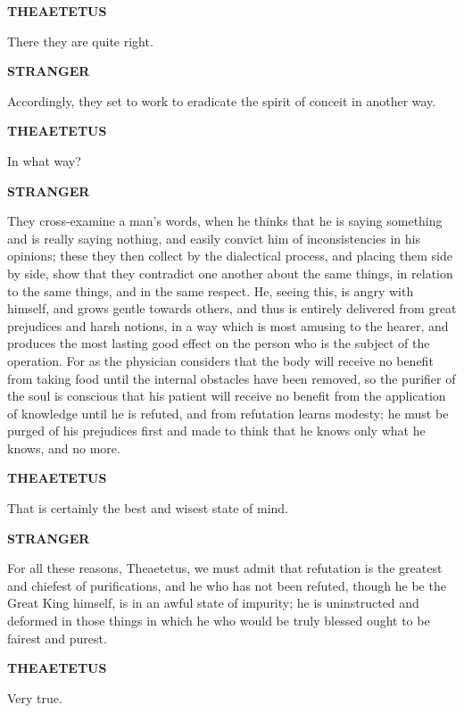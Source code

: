 \documentclass[11pt,letter]{article}
\begin{document}
\par \textbf{THEAETETUS}
\par   There they are quite right.

\par \textbf{STRANGER}
\par   Accordingly, they set to work to eradicate the spirit of conceit in another way.

\par \textbf{THEAETETUS}
\par   In what way?

\par \textbf{STRANGER}
\par   They cross-examine a man's words, when he thinks that he is saying something and is really saying nothing, and easily convict him of inconsistencies in his opinions; these they then collect by the dialectical process, and placing them side by side, show that they contradict one another about the same things, in relation to the same things, and in the same respect. He, seeing this, is angry with himself, and grows gentle towards others, and thus is entirely delivered from great prejudices and harsh notions, in a way which is most amusing to the hearer, and produces the most lasting good effect on the person who is the subject of the operation. For as the physician considers that the body will receive no benefit from taking food until the internal obstacles have been removed, so the purifier of the soul is conscious that his patient will receive no benefit from the application of knowledge until he is refuted, and from refutation learns modesty; he must be purged of his prejudices first and made to think that he knows only what he knows, and no more.

\par \textbf{THEAETETUS}
\par   That is certainly the best and wisest state of mind.

\par \textbf{STRANGER}
\par   For all these reasons, Theaetetus, we must admit that refutation is the greatest and chiefest of purifications, and he who has not been refuted, though he be the Great King himself, is in an awful state of impurity; he is uninstructed and deformed in those things in which he who would be truly blessed ought to be fairest and purest.

\par \textbf{THEAETETUS}
\par   Very true.
\end{document}
